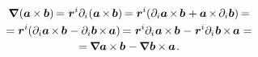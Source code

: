 \nopagebreak\vspace{-0.4em}\begin{multline}\label{gradientofcrossproductoftwovectors}
\boldnabla \hspace{-0.2ex} \left( \bm{a} \hspace{-0.1ex} \times \hspace{-0.1ex} \bm{b} \right) \hspace{-0.2ex}
= \hspace{.1ex} \locationvector^i \partial_i \hspace{-0.3ex} \left( \bm{a} \hspace{-0.2ex} \times \hspace{-0.2ex} \bm{b} \right) \hspace{-0.2ex}
= \locationvector^i \hspace{-0.4ex} \left( \partial_i \bm{a} \hspace{-0.2ex} \times \hspace{-0.2ex} \bm{b} \hspace{.1ex} +
\bm{a} \hspace{-0.2ex} \times \hspace{-0.2ex} \partial_i \bm{b} \right) \hspace{-0.2ex} =
\\[-0.1em]
%
= \locationvector^i \hspace{-0.4ex} \left( \partial_i \bm{a} \hspace{-0.2ex} \times \hspace{-0.2ex} \bm{b} \hspace{.1ex} -
\partial_i \bm{b} \hspace{-0.2ex} \times \hspace{-0.2ex} \bm{a} \right) \hspace{-0.2ex}
= \hspace{.1ex} \locationvector^i \partial_i \hspace{.1ex} \bm{a} \hspace{-0.2ex} \times \hspace{-0.2ex} \bm{b} \hspace{.1ex} - \hspace{.1ex}
\locationvector^i \partial_i \hspace{.1ex} \bm{b} \hspace{-0.2ex} \times \hspace{-0.2ex} \bm{a} =
\\[-0.1em]
%
= \hspace{-0.12ex} \boldnabla \bm{a} \hspace{-0.1ex} \times \hspace{-0.1ex} \bm{b} \hspace{.12ex} - \hspace{-0.12ex}
\boldnabla \hspace{.1ex} \bm{b} \hspace{-0.1ex} \times \hspace{-0.1ex} \bm{a}
\hspace{.2ex} .
\end{multline}

